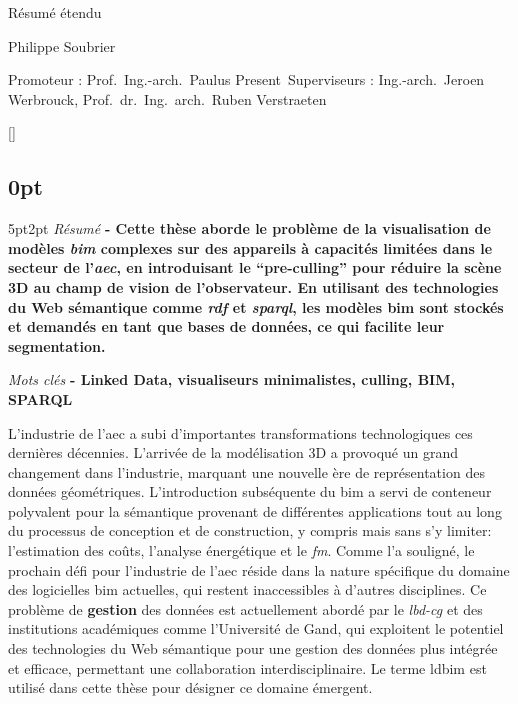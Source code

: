 \begin{center}
    \sffamily
    \huge Résumé étendu

    \Large Philippe Soubrier

    \normalsize
    Promoteur : Prof.\ Ing.-arch.\ Paulus Present\
    Superviseurs : Ing.-arch.\ Jeroen Werbrouck, Prof.\ dr.\ Ing.\ arch.\ Ruben Verstraeten
\end{center}
\begin{refsection}
    []{}
    \begin{multicols}{2}
        \small
        \titlespacing\subsection{0pt}{5pt}{2pt}
        \emph{Résumé} \textbf{
            - Cette thèse aborde le problème de la visualisation de modèles \emph{\ac{bim}} complexes sur des appareils à capacités limitées dans le secteur de l'\emph{\ac{aec}}, en introduisant le \enquote{pre-culling} pour réduire la scène 3D au champ de vision de l'observateur. En utilisant des technologies du Web sémantique comme \emph{\ac{rdf}} et \emph{\ac{sparql}}, les modèles \ac{bim} sont stockés et demandés en tant que bases de données, ce qui facilite leur segmentation.
        }

        \emph{Mots clés} \textbf{
            - Linked Data, visualiseurs minimalistes, culling, BIM, SPARQL
        }

        L'industrie de l'\ac{aec} a subi d'importantes transformations technologiques ces dernières décennies. L'arrivée de la modélisation 3D a provoqué un grand changement dans l'industrie, marquant une nouvelle ère de représentation des données géométriques. L'introduction subséquente du \ac{bim} a servi de conteneur polyvalent pour la sémantique provenant de différentes applications tout au long du processus de conception et de construction, y compris mais sans s'y limiter: l'estimation des coûts, l'analyse énergétique et le \emph{\ac{fm}}. Comme \cite{Werbrouck2018} l'a souligné, le prochain défi pour l'industrie de l'\ac{aec} réside dans la nature spécifique du domaine des logicielles \ac{bim} actuelles, qui restent inaccessibles à d'autres disciplines. Ce problème de \textbf{gestion} des données est actuellement abordé par le \emph{\ac{lbd-cg}} et des institutions académiques comme l'Université de Gand, qui exploitent le potentiel des technologies du Web sémantique pour une gestion des données plus intégrée et efficace, permettant une collaboration interdisciplinaire. Le terme \ac{ldbim} est utilisé dans cette thèse pour désigner ce domaine émergent.


\end{multicols}
\end{refsection}
